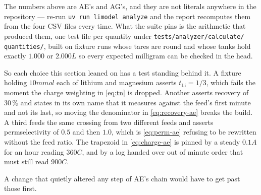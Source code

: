 The numbers above are AE's and AG's, and they are not literals anywhere in the repository ---
re-run \texttt{uv run limodel analyze} and the report recomputes them from the four CSV files
every time. What the suite pins is the arithmetic that produced them, one test file per
quantity under \texttt{tests/\allowbreak analyzer/\allowbreak calculate/\allowbreak
quantities/}, built on fixture runs whose
tares are round and whose tanks hold exactly $1.000$ or $2.000\unit{L}$ so every expected
milligram can be checked in the head.

So each choice this section leaned on has a test standing behind it. A fixture holding
$10\unit{mmol}$ each of lithium and magnesium asserts $t_{\mathrm{Li}} = 1/3$, which fails the
moment the charge weighting in \eqref{eq:tn} is dropped. Another asserts recovery of
$30\,\%$ and states in its own name that it measures against the feed's first minute and not
its last, so moving the denominator in \eqref{eq:recovery-ae} breaks the build. A third feeds the
same crossing from two different feeds and asserts permselectivity of $0.5$ and then $1.0$,
which is \eqref{eq:perm-ae} refusing to be rewritten without the feed ratio. The trapezoid in
\eqref{eq:charge-ae} is pinned by a steady $0.1\unit{A}$ for an hour reading $360\unit{C}$, and
by a log handed over out of minute order that must still read $900\unit{C}$.

A change that quietly altered any step of AE's chain would have to get past those first.
